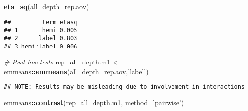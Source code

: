 \documentclass[
]{article}
\newenvironment{Shaded}{\begin{snugshade}}{\end{snugshade}}
\newcommand{\CommentTok}[1]{\textcolor[rgb]{0.56,0.35,0.01}{\textit{#1}}}
\newcommand{\DataTypeTok}[1]{\textcolor[rgb]{0.13,0.29,0.53}{#1}}
\newcommand{\KeywordTok}[1]{\textcolor[rgb]{0.13,0.29,0.53}{\textbf{#1}}}
\newcommand{\NormalTok}[1]{#1}
\newcommand{\OperatorTok}[1]{\textcolor[rgb]{0.81,0.36,0.00}{\textbf{#1}}}
\newcommand{\StringTok}[1]{\textcolor[rgb]{0.31,0.60,0.02}{#1}}
\begin{document}
\begin{Shaded}
\begin{Highlighting}[]
\KeywordTok{eta_sq}\NormalTok{(all_depth_rep.aov)}
\end{Highlighting}
\end{Shaded}

\begin{verbatim}
##         term etasq
## 1       hemi 0.005
## 2      label 0.803
## 3 hemi:label 0.006
\end{verbatim}

\begin{Shaded}
\begin{Highlighting}[]
\CommentTok{# Post hoc tests}
\NormalTok{rep_all_depth.m1 <-}\StringTok{ }\NormalTok{emmeans}\OperatorTok{::}\KeywordTok{emmeans}\NormalTok{(all_depth_rep.aov,}\StringTok{'label'}\NormalTok{)}
\end{Highlighting}
\end{Shaded}

\begin{verbatim}
## NOTE: Results may be misleading due to involvement in interactions
\end{verbatim}

\begin{Shaded}
\begin{Highlighting}[]
\NormalTok{emmeans}\OperatorTok{::}\KeywordTok{contrast}\NormalTok{(rep_all_depth.m1, }\DataTypeTok{method=}\StringTok{'pairwise'}\NormalTok{)}
\end{Highlighting}
\end{Shaded}
\end{document}
